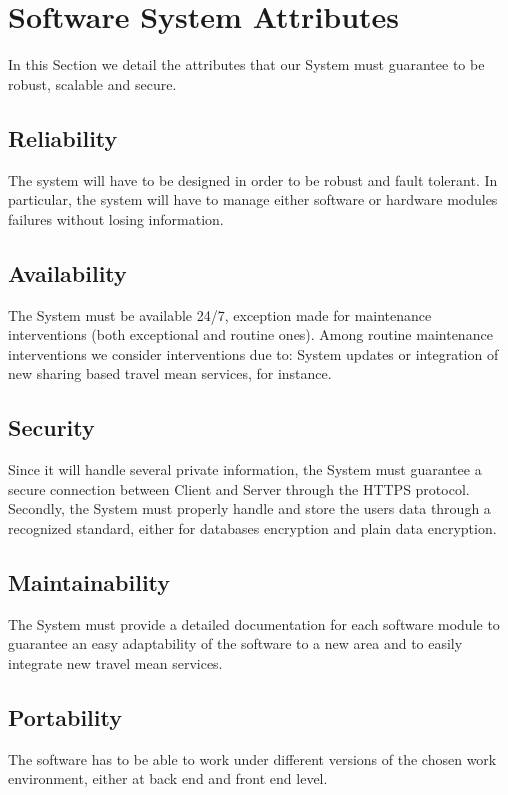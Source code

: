 \section{Software System Attributes}
In this Section we detail the attributes that our System must guarantee to be robust, scalable and secure.

\subsection{Reliability} 
The system will have to be designed in order to be robust and fault tolerant. In particular, the system will have to manage either software or hardware modules failures without losing information.

\subsection{Availability}
The System must be available 24/7, exception made for maintenance interventions (both exceptional and routine ones). Among routine maintenance interventions we consider interventions due to: System updates or integration of new sharing based travel mean services, for instance.  


\subsection{Security}
Since it will handle several private information, the System must guarantee a secure connection between Client and Server through the HTTPS protocol.
Secondly, the System must properly handle and store the users data through a recognized standard, either for databases encryption and plain data encryption. 

\subsection{Maintainability}
The System must provide a detailed documentation for each software module to guarantee an easy adaptability of the software to a new area and to easily integrate new travel mean services.  

\subsection{Portability}

The software has to be able to work under different versions of the chosen work environment, either at back end and front end level.